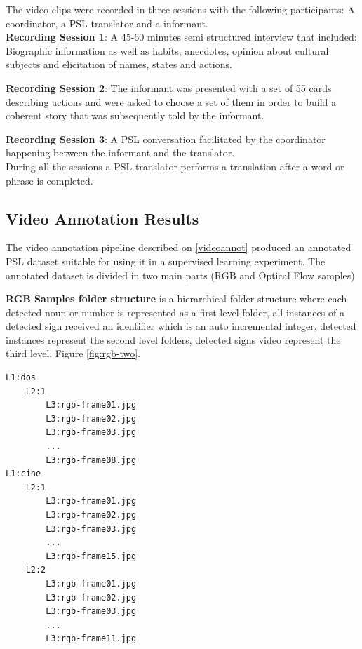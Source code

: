 \documentclass[twocolumn,conference]{article}
\begin{document}
The video clips were recorded in three sessions with the following participants: A coordinator, a PSL \cite{lsp_2015} translator and a informant.\\

\textbf{Recording Session 1}: A 45-60 minutes semi structured interview that included: Biographic information as well as habits, anecdotes, opinion about cultural subjects and elicitation of names, states and actions. 

\textbf{Recording Session 2}: The informant was presented with a set of 55 cards describing actions and were asked to choose a set of them in order to build a coherent story that was subsequently told by the informant.

\textbf{Recording Session 3}: A PSL \cite{lsp_2015} conversation facilitated by the coordinator happening between the informant and the translator.\\

During all the sessions a PSL \cite{lsp_2015} translator performs a translation after a word or phrase is completed.

\subsection{Video Annotation Results}\label{video-annotation-results}
The video annotation pipeline described on \ref{videoannot} produced an annotated PSL dataset suitable for using it in a supervised learning experiment. The annotated dataset is divided in two main parts (RGB and Optical Flow samples)

\textbf{RGB Samples folder structure} is a hierarchical folder structure where each detected noun or number is represented as a first level folder, all instances of a detected sign received an identifier which is an auto incremental integer, detected instances represent the second level folders, detected signs video represent the third level, Figure \ref{fig:rgb-two}.
\begin{lstlisting}[caption=RGB Samples Folder Structure example, basicstyle=\ttfamily\small]
L1:dos
	L2:1
		L3:rgb-frame01.jpg
		L3:rgb-frame02.jpg
		L3:rgb-frame03.jpg
		...
		L3:rgb-frame08.jpg
L1:cine
	L2:1
		L3:rgb-frame01.jpg
		L3:rgb-frame02.jpg
		L3:rgb-frame03.jpg
		...
		L3:rgb-frame15.jpg
	L2:2
		L3:rgb-frame01.jpg
		L3:rgb-frame02.jpg
		L3:rgb-frame03.jpg
		...
		L3:rgb-frame11.jpg
\end{lstlisting}\label{list:rgb-samples-folders}
\end{document}
